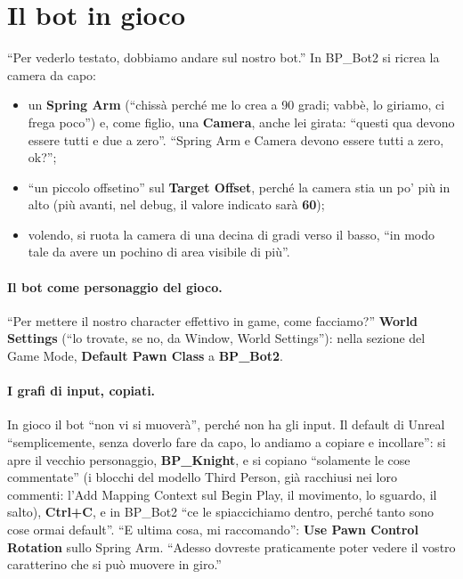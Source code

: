 \section{Il bot in gioco}
\label{ue10:sec:ingioco}

``Per vederlo testato, dobbiamo andare sul nostro bot.'' In BP\_Bot2 si ricrea la
camera da capo:
\begin{itemize}
  \item un \textbf{Spring Arm} (``chissà perché me lo crea a 90 gradi; vabbè, lo giriamo,
        ci frega poco'') e, come figlio, una \textbf{Camera}, anche lei girata: ``questi qua
        devono essere tutti e due a zero''. ``Spring Arm e Camera devono essere tutti a
        zero, ok?'';
  \item ``un piccolo offsetino'' sul \textbf{Target Offset}, perché la camera stia un po'
        più in alto (più avanti, nel debug, il valore indicato sarà \textbf{60});
  \item volendo, si ruota la camera di una decina di gradi verso il basso, ``in modo tale
        da avere un pochino di area visibile di più''.
\end{itemize}

\paragraph{Il bot come personaggio del gioco.} ``Per mettere il nostro character effettivo
in game, come facciamo?'' \textbf{World Settings} (``lo trovate, se no, da Window, World
Settings''): nella sezione del Game Mode, \textbf{Default Pawn Class} a
\textbf{BP\_Bot2}.

\paragraph{I grafi di input, copiati.} In gioco il bot ``non vi si muoverà'', perché non ha
gli input. Il default di Unreal ``semplicemente, senza doverlo fare da capo, lo andiamo a
copiare e incollare'': si apre il vecchio personaggio, \textbf{BP\_Knight}, e si copiano
``solamente le cose commentate'' (i blocchi del modello Third Person, già racchiusi nei
loro commenti: l'Add Mapping Context sul Begin Play, il movimento, lo sguardo, il salto),
\textbf{Ctrl+C}, e in BP\_Bot2 ``ce le spiaccichiamo dentro, perché tanto sono cose ormai
default''. ``E ultima cosa, mi raccomando'': \textbf{Use Pawn Control Rotation} sullo
Spring Arm. ``Adesso dovreste praticamente poter vedere il vostro caratterino che si può
muovere in giro.''

